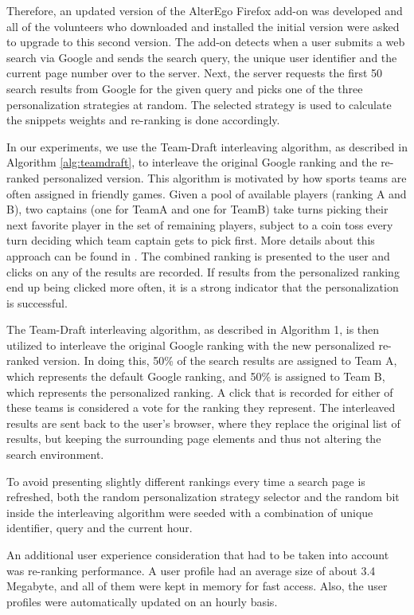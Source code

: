 \documentclass{sig-alternate}
\begin{document}
Therefore, an updated version of the AlterEgo Firefox add-on was developed and all of the volunteers who downloaded and installed the initial version were asked to upgrade to this second version. The add-on detects when a user submits a web search via Google and sends the search query, the unique user identifier and the current page number over to the server. Next, the server requests the first 50 search results from Google for the given query and picks one of the three personalization strategies at random. The selected strategy is used to calculate the snippets weights and re-ranking is done accordingly.

In our experiments, we use the Team-Draft interleaving algorithm, as described in Algorithm \ref{alg:teamdraft}, to interleave the original Google ranking and the re-ranked personalized version. This algorithm is motivated by how sports teams are often assigned in friendly games. Given a pool of available players (ranking A and B), two captains (one for TeamA and one for TeamB) take turns picking their next favorite player in the set of remaining players, subject to a coin toss every turn deciding which team captain gets to pick first. More details about this approach can be found in \cite{Radlinski:Kurup}. The combined ranking is presented to the user and clicks on any of the results are recorded. If results from the personalized ranking end up being clicked more often, it is a strong indicator that the personalization is successful.

The Team-Draft interleaving algorithm, as described in Algorithm 1, is then utilized to interleave the original Google ranking with the new personalized re-ranked version. In doing this, 50\% of the search results are assigned to Team A, which represents the default Google ranking, and 50\% is assigned to Team B, which represents the personalized ranking. A click that is recorded for either of these teams is considered a vote for the ranking they represent. The interleaved results are sent back to the user's browser, where they replace the original list of results, but keeping the surrounding page elements and thus not altering the search environment.

To avoid presenting slightly different rankings every time a search page is refreshed, both the random personalization strategy selector and the random bit inside the interleaving algorithm were seeded with a combination of unique identifier, query and the current hour.

An additional user experience consideration that had to be taken into account was re-ranking performance. A user profile had an average size of about 3.4 Megabyte, and all of them were kept in memory for fast access. Also, the user profiles were automatically updated on an hourly basis.
\end{document}
